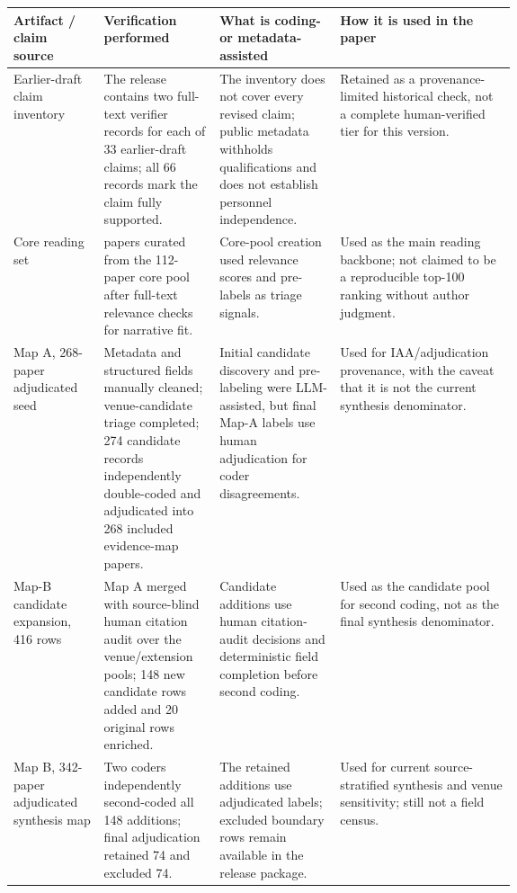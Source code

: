 \begin{table}[t]
\centering
\scriptsize
\renewcommand{\arraystretch}{0.94}
\begin{tabularx}{\linewidth}{>{\raggedright\arraybackslash}p{0.18\linewidth}>{\raggedright\arraybackslash}p{0.23\linewidth}>{\raggedright\arraybackslash}p{0.24\linewidth}X}
\toprule
\textbf{Artifact / claim source} & \textbf{Verification performed} & \textbf{What is coding- or metadata-assisted} & \textbf{How it is used in the paper} \\
\midrule
Earlier-draft claim inventory & The release contains two full-text verifier records for each of 33 earlier-draft claims; all 66 records mark the claim fully supported. & The inventory does not cover every revised claim; public metadata withholds qualifications and does not establish personnel independence. & Retained as a provenance-limited historical check, not a complete human-verified tier for this version. \\
Core reading set & 100 papers curated from the 112-paper core pool after full-text relevance checks for narrative fit. & Core-pool creation used relevance scores and pre-labels as triage signals. & Used as the main reading backbone; not claimed to be a reproducible top-100 ranking without author judgment. \\
Map A, 268-paper adjudicated seed & Metadata and structured fields manually cleaned; venue-candidate triage completed; 274 candidate records independently double-coded and adjudicated into 268 included evidence-map papers. & Initial candidate discovery and pre-labeling were LLM-assisted, but final Map-A labels use human adjudication for coder disagreements. & Used for IAA/adjudication provenance, with the caveat that it is not the current synthesis denominator. \\
Map-B candidate expansion, 416 rows & Map A merged with source-blind human citation audit over the venue/extension pools; 148 new candidate rows added and 20 original rows enriched. & Candidate additions use human citation-audit decisions and deterministic field completion before second coding. & Used as the candidate pool for second coding, not as the final synthesis denominator. \\
Map B, 342-paper adjudicated synthesis map & Two coders independently second-coded all 148 additions; final adjudication retained 74 and excluded 74. & The retained additions use adjudicated labels; excluded boundary rows remain available in the release package. & Used for current source-stratified synthesis and venue sensitivity; still not a field census. \\

\end{tabularx}
\end{table}
